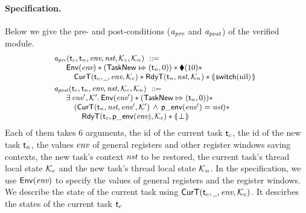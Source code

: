 \paragraph{\textbf{Specification.}}
Below we give the pre- and post-conditions
($\textit{a}_\textit{pre}$ and $\textit{a}_\textit{post}$) of the verified module.
\[
    \small
    \begin{array}{l}
        \textit{a}_\textit{pre}(\textsf{t}_c, \textsf{t}_n, \textit{env}, \textit{nst}, \mathcal{K}_c, \mathcal{K}_n)
        \ ::\!\!{=} \\
        \quad
        \begin{array}{l}
            \mathsf{Env}({\textit{env}}) *
            ({\mathsf{TaskNew}}\Mapsto{(\textsf{t}_n, 0)}) *
            \blacklozenge({10}) * \\
            \quad
            \textsf{CurT}({\textsf{t}_c}, {\underline{\ \,}}, {\textit{env}}, {\mathcal{K}_c}) *
            \textsf{RdyT}({\textsf{t}_n}, {\textit{nst}}, {\mathcal{K}_n}) *
            \llparenthesis {\, \mathsf{switch}(\text{nil}) \,} \rrparenthesis
        \end{array}
        \\
        \\[-8pt]
        \textit{a}_\textit{post}(\textsf{t}_c, \textsf{t}_n, \textit{env}, \textit{nst}, \mathcal{K}_c, \mathcal{K}_n)
        \ ::\!\!{=} \\
        \quad
        \begin{array}{l}
            \exists \, \textit{env}', \mathcal{K}'. \, \mathsf{Env}({\textit{env}'})
            * ({\mathsf{TaskNew}}\Mapsto{(\textsf{t}_n, 0)})
            * \
            \\
            \quad
            (\textsf{CurT}({\textsf{t}_n}, {\textit{nst}}, {\textit{env}'}, {\mathcal{K}'})
            \,\land\,\mathsf{p\_env}({\textit{env}'}) = \textit{nst}) *
            \\
            \qquad
            \textsf{RdyT}({\textsf{t}_c}, {\mathsf{p\_env}({\textit{env}})}, {\mathcal{K}_c}) *
            \llparenthesis {\, \perp\,} \rrparenthesis
        \end{array}
    \end{array}
\]
Each of them takes 6 arguments,
the id of the current task $\textsf{t}_c$, the id of the new
task $\textsf{t}_n$, the values $\textit{env}$ of general registers and
other register windows saving contexts,
the new task's context $\textit{nst}$ to be restored, 
the current task's thread local state $\mathcal{K}_c$ 
and the new task's thread local state $\mathcal{K}_n$.
In the specification,
we use $\mathsf{Env}({\textit{env}})$ to specify the values of
general registers and the register windows.
We describe the state of the current task
using $\textsf{CurT}({\textsf{t}_c}, {\underline{\ \,}}, {\textit{env}}, {\mathcal{K}_c})$.
It descirbes the states of the current task $\textsf{t}_c$ 
